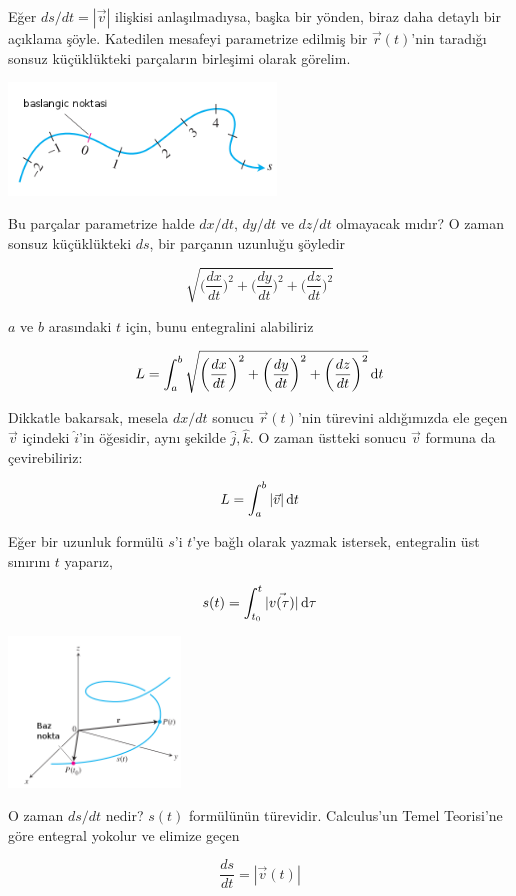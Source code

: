 \documentclass[12pt,fleqn]{article}\usepackage{../../common}
\begin{document}
Eğer $ds/dt = |\vec{v}|$ ilişkisi anlaşılmadıysa, başka bir yönden, biraz daha
detaylı bir açıklama şöyle. Katedilen mesafeyi parametrize edilmiş bir
$\vec{r}(t)$'nin taradığı sonsuz küçüklükteki parçaların birleşimi olarak
görelim.

\includegraphics[height=3cm]{6_10.png}

Bu parçalar parametrize halde $dx/dt$, $dy/dt$ ve $dz/dt$ olmayacak mıdır?
O zaman sonsuz küçüklükteki $ds$, bir parçanın uzunluğu şöyledir

$$ \sqrt{ 
\bigg(\frac{dx}{dt}\bigg)^2 + 
\bigg(\frac{dy}{dt}\bigg)^2 + 
\bigg(\frac{dz}{dt}\bigg)^2 }
$$

$a$ ve $b$ arasındaki $t$ için, bunu entegralini alabiliriz

$$ L = \int_a^b \sqrt{ 
\bigg(\frac{dx}{dt}\bigg)^2 + 
\bigg(\frac{dy}{dt}\bigg)^2 + 
\bigg(\frac{dz}{dt}\bigg)^2 
} \,\mathrm{d} t $$

Dikkatle bakarsak, mesela $dx/dt$ sonucu $\vec{r}(t)$'nin türevini
aldığımızda ele geçen $\vec{v}$ içindeki $\hat{i}$'in öğesidir, aynı
şekilde $\hat{j},\hat{k}$. O zaman üstteki sonucu $\vec{v}$ formuna da
çevirebiliriz: 

$$ L = \int_a^b |\vec{v}| \,\mathrm{d} t $$

Eğer bir uzunluk formülü $s$'i $t$'ye bağlı olarak yazmak istersek,
entegralin üst sınırını $t$ yaparız,

$$ s(t) = \int_{t_0}^t |\vec{v(\tau)}| \,\mathrm{d}\tau  $$

\includegraphics[height=4cm]{6_9.png}

O zaman $ds/dt$ nedir? $s(t)$ formülünün türevidir. Calculus'un Temel
Teorisi'ne göre entegral yokolur ve elimize geçen

$$ \frac{ds}{dt} = |\vec{v}(t)|$$
\end{document}
